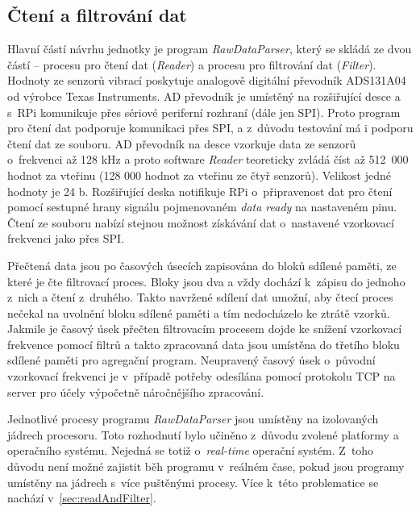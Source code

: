 \subsection{Čtení a filtrování dat}
Hlavní částí návrhu jednotky je program \textit{RawDataParser}, který se skládá ze dvou částí -- procesu pro čtení dat (\textit{Reader}) a procesu pro filtrování dat (\textit{Filter}). Hodnoty ze senzorů vibrací poskytuje analogově digitální převodník ADS131A04 od výrobce Texas Instruments. AD převodník je umístěný na rozšiřující desce a s~RPi komunikuje přes sériové periferní rozhraní (dále jen SPI). Proto program pro čtení dat podporuje komunikaci přes SPI, a z~důvodu testování má i podporu čtení dat ze souboru. AD převodník na desce vzorkuje data ze senzorů o~frekvenci až 128 kHz a proto software \textit{Reader} teoreticky zvládá číst až 512~000 hodnot za vteřinu (128 000 hodnot za vteřinu ze čtyř senzorů). Velikost jedné hodnoty je 24 b. Rozšiřující deska notifikuje RPi o~připravenost dat pro čtení pomocí sestupné hrany signálu pojmenovaném \textit{data ready} na nastaveném pinu. Čtení ze souboru nabízí stejnou možnost získávání dat o~nastavené vzorkovací frekvenci jako přes SPI.

Přečtená data jsou po časových úsecích zapisována do bloků sdílené paměti, ze které je čte filtrovací proces. Bloky jsou dva a vždy dochází k~zápisu do jednoho z~nich a čtení z~druhého. Takto navržené sdílení dat umožní, aby čtecí proces nečekal na uvolnění bloku sdílené paměti a tím nedocházelo ke ztrátě vzorků. Jakmile je časový úsek přečten filtrovacím procesem dojde ke snížení vzorkovací frekvence pomocí filtrů a takto zpracovaná data jsou umístěna do třetího bloku sdílené paměti pro agregační program. Neupravený časový úsek o~původní vzorkovací frekvenci je v~případě potřeby odesílána pomocí protokolu TCP na server pro účely výpočetně náročnějšího zpracování.

Jednotlivé procesy programu \textit{RawDataParser} jsou umístěny na izolovaných jádrech procesoru. Toto rozhodnutí bylo učiněno z~důvodu zvolené platformy a operačního systému. Nejedná se totiž o~\textit{real-time} operační systém. Z~toho důvodu není možné zajistit běh programu v~reálném čase, pokud jsou programy umístěny na jádrech s~více puštěnými procesy. Více k~této problematice se nachází v~\ref{sec:readAndFilter}.
 
